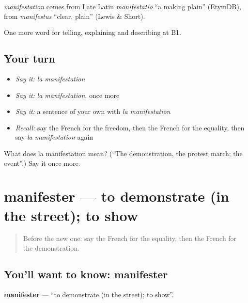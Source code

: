 \begin{cousinweb}
\emph{manifestation} comes from Late Latin \emph{manifēstātiō} \textquotedblleft{}a making plain\textquotedblright{} (EtymDB), from \emph{manifestus} \textquotedblleft{}clear, plain\textquotedblright{} (Lewis \& Short).
\end{cousinweb}

\begin{grammarlens}[title={What you've built}]
One more word for telling, explaining and describing at B1.
\end{grammarlens}

\subsection*{Your turn}
\begin{itemize}
\raggedright
  \item \emph{Say it:} \emph{la manifestation}
  \item \emph{Say it:} \emph{la manifestation}, once more
  \item \emph{Say it:} a sentence of your own with \emph{la manifestation}
  \item \emph{Recall:} say the French for the freedom, then the French for the equality, then say \emph{la manifestation} again
\end{itemize}

\begin{tcolorbox}[breakable,colback=teal!4,colframe=teal!35!black,title={Before you move on}]
What does la manifestation mean? (\textquotedblleft{}The demonstration, the protest march; the event\textquotedblright{}.) Say it once more.
\end{tcolorbox}
\section[manifester]{manifester — to demonstrate (in the street); to show}

\label{lesson:FR-C363-manifester}



\begin{quote}
Before the new one: say the French for the equality, then the French for the demonstration.
\end{quote}

\subsection*{You'll want to know: manifester}
\textbf{manifester} — \textquotedblleft{}to demonstrate (in the street); to show\textquotedblright{}.

